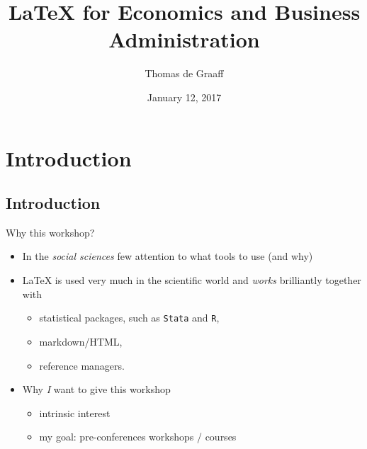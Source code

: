 \documentclass[ignorenonframetext]{beamer}
\title{\LaTeX{} for Economics and Business Administration}
\author{Thomas de Graaff}
\date{January 12, 2017}
\begin{document}
\frame{\titlepage}

\section{Introduction}\label{introduction}

\subsection{Introduction}\label{introduction-1}

\begin{frame}{Why this workshop?}

\begin{itemize}
\item
  In the \emph{social sciences} few attention to what tools to use (and why)
\item
  \LaTeX{} is used very much in the scientific world and \emph{works} brilliantly together with
  \begin{itemize}
  \item statistical packages, such as \texttt{Stata} and \texttt{R},
  \item markdown/HTML,
  \item reference managers.
  \end{itemize}
  \item Why \emph{I} want to give this workshop
  \begin{itemize}
	  \item intrinsic interest
	  \item my goal: pre-conferences workshops / courses
  \end{itemize}
\end{itemize}
\end{frame}
\end{document}
